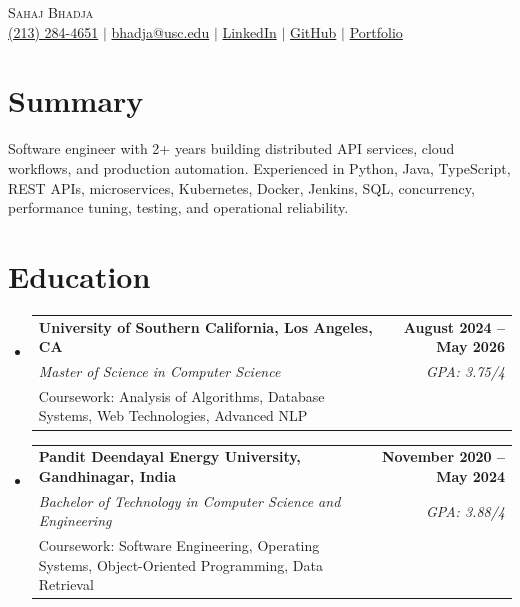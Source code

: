 \documentclass[letterpaper,10pt]{article}
\makeatletter
\newcommand{\resumeEduSubheading}[5]{\vspace{-1pt}\item\begin{tabular*}{1.0\textwidth}[t]{l@{\extracolsep{\fill}}r}\textbf{#1} & \textbf{\small #2} \\\textit{\small #3} & \textit{\small #4} \\\small #5 & \\\end{tabular*}\vspace{-4pt}}
\newcommand{\resumeSubHeadingListStart}{\begin{itemize}[leftmargin=0.0in,label={}]}
\newcommand{\resumeSubHeadingListEnd}{\end{itemize}}
\makeatother
\begin{document}
\begin{center}
  {\Huge \scshape Sahaj Bhadja} \\ \vspace{1pt}
  \small \href{tel:2132844651}{(213) 284-4651} $|$ \href{mailto:bhadja@usc.edu}{bhadja@usc.edu} $|$
  \href{https://www.linkedin.com/in/sahaj-bhadja/}{LinkedIn} $|$ \href{https://github.com/sahaj-bhadja}{GitHub} $|$ \href{https://sahaj-bhadja.github.io/}{Portfolio}
\end{center}
\vspace{-13pt}

\section{Summary}
\small Software engineer with 2+ years building distributed API services, cloud workflows, and production automation. Experienced in Python, Java, TypeScript, REST APIs, microservices, Kubernetes, Docker, Jenkins, SQL, concurrency, performance tuning, testing, and operational reliability.

\section{Education}
\resumeSubHeadingListStart
  \resumeEduSubheading{University of Southern California, Los Angeles, CA}{August 2024 -- May 2026}{Master of Science in Computer Science}{GPA: 3.75/4}{Coursework: Analysis of Algorithms, Database Systems, Web Technologies, Advanced NLP}
  \vspace{2pt}
  \resumeEduSubheading{Pandit Deendayal Energy University, Gandhinagar, India}{November 2020 -- May 2024}{Bachelor of Technology in Computer Science and Engineering}{GPA: 3.88/4}{Coursework: Software Engineering, Operating Systems, Object-Oriented Programming, Data Retrieval}
\resumeSubHeadingListEnd
\end{document}
